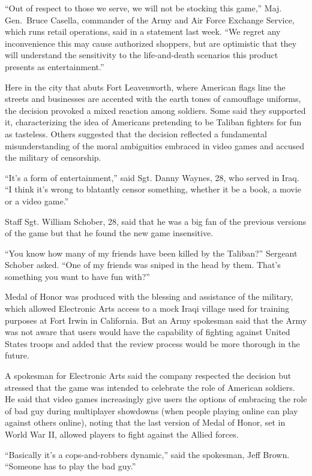 ﻿\documentclass[12pt]{article}
\begin{document}
``Out of respect to those we serve, we will not be stocking this game,'' Maj. Gen.~Bruce Casella,
commander of the Army and Air Force Exchange Service, which runs retail operations, said in a
statement last week. ``We regret any inconvenience this may cause authorized shoppers, but are
optimistic that they will understand the sensitivity to the life-and-death scenarios this product
presents as entertainment.''

Here in the city that abuts Fort Leavenworth, where American flags line the streets and businesses
are accented with the earth tones of camouflage uniforms, the decision provoked a mixed reaction
among soldiers. Some said they supported it, characterizing the idea of Americans pretending to be
Taliban fighters for fun as tasteless. Others suggested that the decision reflected a fundamental
misunderstanding of the moral ambiguities embraced in video games and accused the military of
censorship.

``It's a form of entertainment,'' said Sgt. Danny Waynes, 28, who served in Iraq. ``I think it's
wrong to blatantly censor something, whether it be a book, a movie or a video game.''

Staff Sgt. William Schober, 28, said that he was a big fan of the previous versions of the game but
that he found the new game insensitive.

``You know how many of my friends have been killed by the Taliban?'' Sergeant Schober asked. ``One
of my friends was sniped in the head by them. That's something you want to have fun with?''

Medal of Honor was produced with the blessing and assistance of the military, which allowed
Electronic Arts access to a mock Iraqi village used for training purposes at Fort Irwin in
California. But an Army spokesman said that the Army was not aware that users would have the
capability of fighting against United States troops and added that the review process would be more
thorough in the future.

A spokesman for Electronic Arts said the company respected the decision but stressed that the game
was intended to celebrate the role of American soldiers. He said that video games increasingly give
users the options of embracing the role of bad guy during multiplayer showdowns (when people playing
online can play against others online), noting that the last version of Medal of Honor, set in World
War II, allowed players to fight against the Allied forces.

``Basically it's a cops-and-robbers dynamic,'' said the spokesman, Jeff Brown. ``Someone has to play
the bad guy.''
\end{document}
